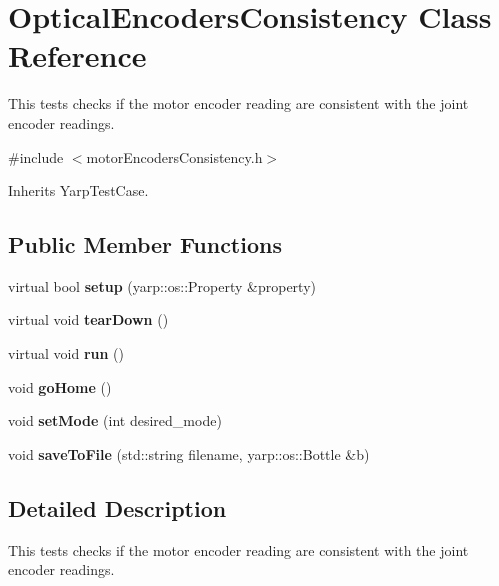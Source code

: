 \section{Optical\-Encoders\-Consistency Class Reference}
\label{classOpticalEncodersConsistency}


This tests checks if the motor encoder reading are consistent with the joint encoder readings.  




{\ttfamily \#include $<$motor\-Encoders\-Consistency.\-h$>$}



Inherits Yarp\-Test\-Case.

\subsection*{Public Member Functions}
\begin{DoxyCompactItemize}
\item 
virtual bool {\bfseries setup} (yarp\-::os\-::\-Property \&property)\label{classOpticalEncodersConsistency_a51df63f87479ffa4f2f05c99f9c06863}

\item 
virtual void {\bfseries tear\-Down} ()\label{classOpticalEncodersConsistency_a8751028fa2a3bb23acc51693f47a9b75}

\item 
virtual void {\bfseries run} ()\label{classOpticalEncodersConsistency_a372d7c32a10225fcda5e6621c6494ad7}

\item 
void {\bfseries go\-Home} ()\label{classOpticalEncodersConsistency_a1b18ff12291b46dddca9e0a11584887d}

\item 
void {\bfseries set\-Mode} (int desired\-\_\-mode)\label{classOpticalEncodersConsistency_ae1e7c3909700d9a39fe9dad1b4f5c9d5}

\item 
void {\bfseries save\-To\-File} (std\-::string filename, yarp\-::os\-::\-Bottle \&b)\label{classOpticalEncodersConsistency_a7afe73617f00256e49c9a3c506f481a7}

\end{DoxyCompactItemize}


\subsection{Detailed Description}
This tests checks if the motor encoder reading are consistent with the joint encoder readings. 

